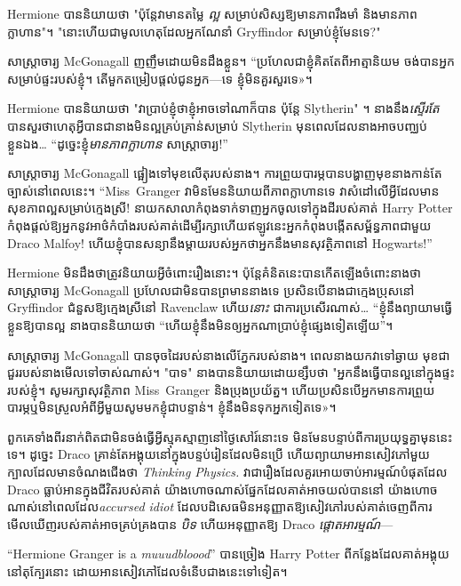 {{Hermione បាននិយាយថា "ប៉ុន្តែវាមានតម្លៃ \emph{ល្អ} សម្រាប់សិស្សឱ្យមានភាពរឹងមាំ និងមានភាពក្លាហាន"។ "នោះហើយជាមូលហេតុដែលអ្នកណែនាំ Gryffindor សម្រាប់ខ្ញុំមែនទេ?"

សាស្រ្តាចារ្យ McGonagall ញញឹមដោយមិនដឹងខ្លួន។ “ប្រហែល​ជា​ខ្ញុំ​គិត​តែ​ពី​អាត្មានិយម ចង់​បាន​អ្នក​សម្រាប់​ផ្ទះ​របស់​ខ្ញុំ។ តើ​មួក​តម្រៀប​ផ្ដល់​ជូន​អ្នក—ទេ ខ្ញុំ​មិន​គួរ​សួរ​ទេ»។

Hermione បាននិយាយថា "វាប្រាប់ខ្ញុំថាខ្ញុំអាចទៅណាក៏បាន ប៉ុន្តែ Slytherin" ។ នាងនឹង\emph{ស្ទើរតែ}បានសួរថាហេតុអ្វីបានជានាងមិនល្អគ្រប់គ្រាន់សម្រាប់ Slytherin មុនពេលដែលនាងអាចបញ្ឈប់ខ្លួនឯង… “ដូច្នេះខ្ញុំ\emph{មានភាពក្លាហាន} សាស្រ្តាចារ្យ!”

សាស្រ្តាចារ្យ McGonagall ផ្អៀងទៅមុខលើតុរបស់នាង។ ការព្រួយ​បារម្ភ​បាន​បង្ហាញ​មុខ​នាង​កាន់តែ​ច្បាស់​នៅ​ពេល​នេះ។ “Miss~Granger វា​មិន​មែន​និយាយ​ពី​ភាព​ក្លាហាន​ទេ វា​សំដៅ​លើ​អ្វី​ដែល​មាន​សុខភាព​ល្អ​សម្រាប់​ក្មេង​ស្រី! នាយកសាលាកំពុងទាក់ទាញអ្នកចូលទៅក្នុងដីរបស់គាត់ Harry Potter កំពុងផ្តល់ឱ្យអ្នកនូវអាថ៌កំបាំងរបស់គាត់ដើម្បីរក្សាហើយឥឡូវនេះអ្នកកំពុងបង្កើតសម្ព័ន្ធភាពជាមួយ Draco Malfoy! ហើយខ្ញុំបានសន្យានឹងម្តាយរបស់អ្នកថាអ្នកនឹងមានសុវត្ថិភាពនៅ Hogwarts!”

Hermione មិនដឹងថាត្រូវនិយាយអ្វីចំពោះរឿងនោះ។ ប៉ុន្តែគំនិតនេះបានកើតឡើងចំពោះនាងថា សាស្រ្តាចារ្យ McGonagall ប្រហែលជាមិនបានព្រមាននាងទេ ប្រសិនបើនាងជាក្មេងប្រុសនៅ Gryffindor ជំនួសឱ្យក្មេងស្រីនៅ Ravenclaw ហើយ\emph{នោះ} ជាការប្រសើរណាស់… “ខ្ញុំនឹងព្យាយាមធ្វើខ្លួនឱ្យបានល្អ នាង​បាន​និយាយ​ថា “ហើយ​ខ្ញុំ​នឹង​មិន​ឲ្យ​អ្នក​ណា​ប្រាប់​ខ្ញុំ​ផ្សេង​ទៀត​ឡើយ”។

សាស្រ្តាចារ្យ McGonagall បានចុចដៃរបស់នាងលើភ្នែករបស់នាង។ ពេល​នាង​យក​វា​ទៅ​ឆ្ងាយ មុខ​ជា​ជួរ​របស់​នាង​មើល​ទៅ​ចាស់​ណាស់។ "បាទ" នាងបាននិយាយដោយខ្សឹបថា "អ្នកនឹងធ្វើបានល្អនៅក្នុងផ្ទះរបស់ខ្ញុំ។ សូមរក្សាសុវត្ថិភាព Miss~Granger និងប្រុងប្រយ័ត្ន។ ហើយ​ប្រសិន​បើ​អ្នក​មាន​ការ​ព្រួយ​បារម្ភ​ឬ​មិន​ស្រួល​អំពី​អ្វី​មួយ​សូម​មក​ខ្ញុំ​ជា​បន្ទាន់​។ ខ្ញុំ​នឹង​មិន​ទុក​អ្នក​ទៀត​ទេ»។


ពួកគេទាំងពីរនាក់ពិតជាមិនចង់ធ្វើអ្វីស្មុគស្មាញនៅថ្ងៃសៅរ៍នោះទេ មិនមែនបន្ទាប់ពីការប្រយុទ្ធគ្នាមុននេះទេ។ ដូច្នេះ Draco គ្រាន់តែអង្គុយនៅក្នុងបន្ទប់រៀនដែលមិនប្រើ ហើយព្យាយាមអានសៀវភៅមួយក្បាលដែលមានចំណងជើងថា \emph{Thinking Physics.} វាជារឿងដែលគួរអោយចាប់អារម្មណ៍បំផុតដែល Draco ធ្លាប់អានក្នុងជីវិតរបស់គាត់ យ៉ាងហោចណាស់ផ្នែកដែលគាត់អាចយល់បាននៅ យ៉ាងហោចណាស់នៅពេលដែល\emph{accursed idiot} ដែលបដិសេធមិនអនុញ្ញាតឱ្យសៀវភៅរបស់គាត់ចេញពីការមើលឃើញរបស់គាត់អាចគ្រប់គ្រងបាន \emph{បិទ} ហើយអនុញ្ញាតឱ្យ Draco \emph{ផ្តោតអារម្មណ៍}—

“Hermione Granger is a \emph{muuudbloood}” បានច្រៀង Harry Potter ពីកន្លែងដែលគាត់អង្គុយនៅតុក្បែរនោះ ដោយអានសៀវភៅដែលទំនើបជាងនេះទៅទៀត។

}}
